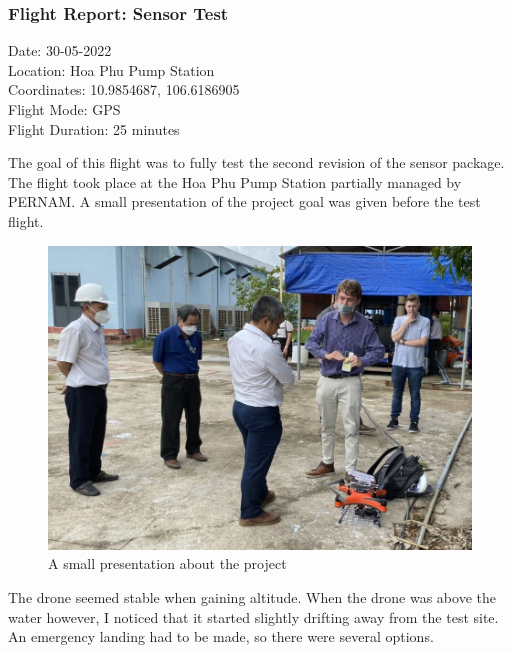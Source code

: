\newpage
\subsubsection{Flight Report: Sensor Test}
\begin{minipage}{1\textwidth}
	\begin{flushright}
		Date: 30-05-2022\\
		Location: Hoa Phu Pump Station\\
		Coordinates: 10.9854687, 106.6186905\\
		Flight Mode: \gls{GPS}\\
		Flight Duration: 25 minutes\\\vspace{5mm}
	\end{flushright}
\end{minipage}

The goal of this flight was to fully test the second revision of the sensor package. The flight took place at the Hoa Phu Pump Station partially managed by PERNAM. A small presentation of the project goal was given before the test flight.

\begin{figure}[h]
\centering
\includegraphics[scale=1.2]{080_testing/flights/32_explanation.jpg}
\caption{A small presentation about the project}
\end{figure}

The drone seemed stable when gaining altitude. When the drone was above the water however, I noticed that it started slightly drifting away from the test site. An emergency landing had to be made, so there were several options.



